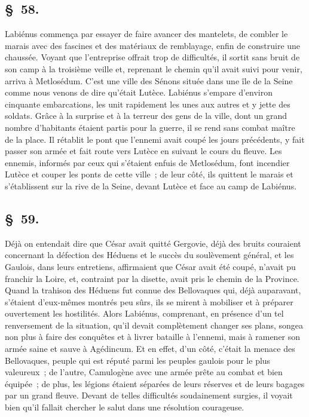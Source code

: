 \documentclass[french,twoside]{book} %
\begin{document}
\subsection[{§ 58.}]{ \textsc{§ 58.} }
\noindent Labiénus commença par essayer de faire avancer des mantelets, de combler le marais avec des fascines et des matériaux de remblayage, enfin de construire une chaussée. Voyant que l’entreprise offrait trop de difficultés, il sortit sans bruit de son camp à la troisième veille et, reprenant le chemin qu’il avait suivi pour venir, arriva à Metlosédum. C'est une ville des Sénons située dans une île de la Seine comme nous venons de dire qu’était Lutèce. Labiénus s’empare d’environ cinquante embarcations, les unit rapidement les unes aux autres et y jette des soldats. Grâce à la surprise et à la terreur des gens de la ville, dont un grand nombre d’habitants étaient partis pour la guerre, il se rend sans combat maître de la place. Il rétablit le pont que l’ennemi avait coupé les jours précédents, y fait passer son armée et fait route vers Lutèce en suivant le cours du fleuve. Les ennemis, informés par ceux qui s’étaient enfuis de Metlosédum, font incendier Lutèce et couper les ponts de cette ville ; de leur côté, ils quittent le marais et s’établissent sur la rive de la Seine, devant Lutèce et face au camp de Labiénus.
\subsection[{§ 59.}]{ \textsc{§ 59.} }
\noindent Déjà on entendait dire que César avait quitté Gergovie, déjà des bruits couraient concernant la défection des Héduens et le succès du soulèvement général, et les Gaulois, dans leurs entretiens, affirmaient que César avait été coupé, n’avait pu franchir la Loire, et, contraint par la disette, avait pris le chemin de la Province. Quand la trahison des Héduens fut connue des Bellovaques qui, déjà auparavant, s’étaient d’eux-mêmes montrés peu sûrs, ils se mirent à mobiliser et à préparer ouvertement les hostilités. Alors Labiénus, comprenant, en présence d’un tel renversement de la situation, qu’il devait complètement changer ses plans, songea non plus à faire des conquêtes et à livrer bataille à l’ennemi, mais à ramener son armée saine et sauve à Agédincum. Et en effet, d’un côté, c’était la menace des Bellovaques, peuple qui est réputé parmi les peuples gaulois pour le plus valeureux ; de l’autre, Camulogène avec une armée prête au combat et bien équipée ; de plus, les légions étaient séparées de leurs réserves et de leurs bagages par un grand fleuve. Devant de telles difficultés soudainement surgies, il voyait bien qu’il fallait chercher le salut dans une résolution courageuse.
\end{document}
